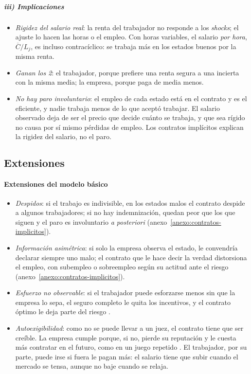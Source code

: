 \documentclass[11pt]{article}
\begin{document}
\subparagraph{iii) Implicaciones}

\begin{itemize}
\item \emph{Rigidez del salario real}: la renta del trabajador no responde a los \emph{shocks}; el ajuste lo hacen las horas o el empleo. Con horas variables, el salario \emph{por hora}, $\overline{C}/L_j$, es incluso contracíclico: se trabaja más en los estados buenos por la misma renta.
\item \emph{Ganan los 2}: el trabajador, porque prefiere una renta segura a una incierta con la misma media; la empresa, porque paga de media menos.
\item \emph{No hay paro involuntario}: el empleo de cada estado está en el contrato y es el eficiente, y nadie trabaja menos de lo que aceptó trabajar. El salario observado deja de ser el precio que decide cuánto se trabaja, y que sea rígido no causa por sí mismo pérdidas de empleo\nocite{Barro1977Long}. Los contratos implícitos explican la rigidez del salario, no el paro.
\end{itemize}

\subsection{Extensiones}\label{sec:contratos-implicitos-extensiones}

\paragraph{Extensiones del modelo básico}

\begin{itemize}
\item \emph{Despidos}: si el trabajo es indivisible, en los estados malos el contrato despide a algunos trabajadores; si no hay indemnización, quedan peor que los que siguen y el paro es involuntario \emph{a posteriori} (anexo~\ref{anexo:contratos-implicitos}).
\item \emph{Información asimétrica}: si solo la empresa observa el estado, le convendría declarar siempre uno malo; el contrato que le hace decir la verdad distorsiona el empleo, con subempleo o sobreempleo según su actitud ante el riesgo (anexo~\ref{anexo:contratos-implicitos}).
\item \emph{Esfuerzo no observable}: si el trabajador puede esforzarse menos sin que la empresa lo sepa, el seguro completo le quita los incentivos, y el contrato óptimo le deja parte del riesgo .
\item \emph{Autoexigibilidad}: como no se puede llevar a un juez, el contrato tiene que ser creíble. La empresa cumple porque, si no, pierde su reputación y le cuesta más contratar en el futuro, como en un juego repetido\nocite{Bull1987Existence} . El trabajador, por su parte, puede irse si fuera le pagan más: el salario tiene que subir cuando el mercado se tensa, aunque no baje cuando se relaja.
\end{itemize}
\end{document}
